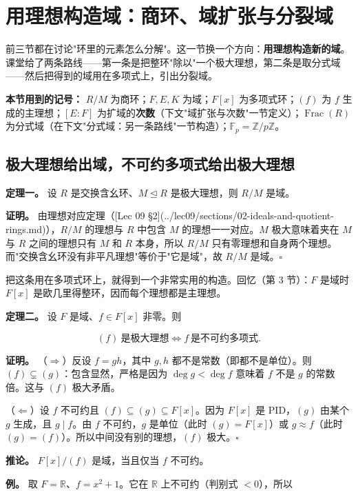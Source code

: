 \section{用理想构造域：商环、域扩张与分裂域}


前三节都在讨论"环里的元素怎么分解"。这一节换一个方向：\textbf{用理想构造新的域}。课堂给了两条路线——第一条是把整环"除以"一个极大理想，第二条是取分式域——然后把得到的域用在多项式上，引出分裂域。

\textbf{本节用到的记号：} $R/M$ 为商环；$F,E,K$ 为域；$F[x]$ 为多项式环；$(f)$ 为 $f$ 生成的主理想；$[E:F]$ 为扩域的\textbf{次数}（下文"域扩张与次数"一节定义）；$\operatorname{Frac}(R)$ 为分式域（在下文"分式域：另一条路线"一节构造）；$\mathbb F_p=\mathbb Z/p\mathbb Z$。

\subsection{极大理想给出域，不可约多项式给出极大理想}


\textbf{定理一。} 设 $R$ 是交换含幺环、$M\trianglelefteq R$ 是极大理想，则 $R/M$ 是域。

\textbf{证明。} 由理想对应定理（[Lec 09 §2](../lec09/sections/02-ideals-and-quotient-rings.md)），$R/M$ 的理想与 $R$ 中包含 $M$ 的理想一一对应。$M$ 极大意味着夹在 $M$ 与 $R$ 之间的理想只有 $M$ 和 $R$ 本身，所以 $R/M$ 只有零理想和自身两个理想。而"交换含幺环没有非平凡理想"等价于"它是域"，故 $R/M$ 是域。$\square$

把这条用在多项式环上，就得到一个非常实用的构造。回忆（第 3 节）：$F$ 是域时 $F[x]$ 是欧几里得整环，因而每个理想都是主理想。

\textbf{定理二。} 设 $F$ 是域、$f\in F[x]$ 非零。则

\[
(f)\ \text{是极大理想}\iff f\ \text{是不可约多项式}.
\]

\textbf{证明。} （$\Rightarrow$）反设 $f=gh$，其中 $g,h$ 都不是常数（即都不是单位）。则 $(f)\subsetneq(g)$：包含显然，严格是因为 $\deg g<\deg f$ 意味着 $f$ 不是 $g$ 的常数倍。这与 $(f)$ 极大矛盾。

（$\Leftarrow$）设 $f$ 不可约且 $(f)\subseteq(g)\subseteq F[x]$。因为 $F[x]$ 是 PID，$(g)$ 由某个 $g$ 生成，且 $g\mid f$。由 $f$ 不可约，$g$ 是单位（此时 $(g)=F[x]$）或 $g\approx f$（此时 $(g)=(f)$）。所以中间没有别的理想，$(f)$ 极大。$\square$

\textbf{推论。} $F[x]/(f)$ 是域，当且仅当 $f$ 不可约。

\textbf{例。} 取 $F=\mathbb R$、$f=x^2+1$。它在 $\mathbb R$ 上不可约（判别式 $<0$），所以

